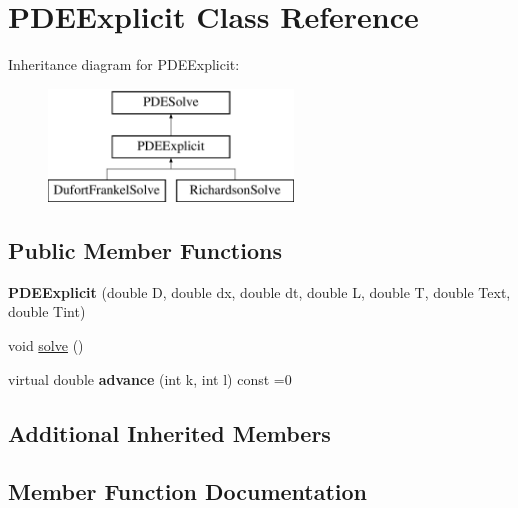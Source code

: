 \hypertarget{class_p_d_e_explicit}{}\section{P\+D\+E\+Explicit Class Reference}
\label{class_p_d_e_explicit}
Inheritance diagram for P\+D\+E\+Explicit\+:\begin{figure}[H]
\begin{center}
\leavevmode
\includegraphics[height=3.000000cm]{class_p_d_e_explicit}
\end{center}
\end{figure}
\subsection*{Public Member Functions}
\begin{DoxyCompactItemize}
\item 
\mbox{\label{class_p_d_e_explicit_a8dd3f39d0a4d04a5b4ca0f8853f776f2}} 
{\bfseries P\+D\+E\+Explicit} (double D, double dx, double dt, double L, double T, double Text, double Tint)
\item 
void \hyperlink{class_p_d_e_explicit_a78282717c8230e9be65599865865e0c7}{solve} ()
\item 
\mbox{\label{class_p_d_e_explicit_aed238f52510878474c02681904013dd3}} 
virtual double {\bfseries advance} (int k, int l) const =0
\end{DoxyCompactItemize}
\subsection*{Additional Inherited Members}


\subsection{Member Function Documentation}
\mbox{\label{class_p_d_e_explicit_a78282717c8230e9be65599865865e0c7}} 
